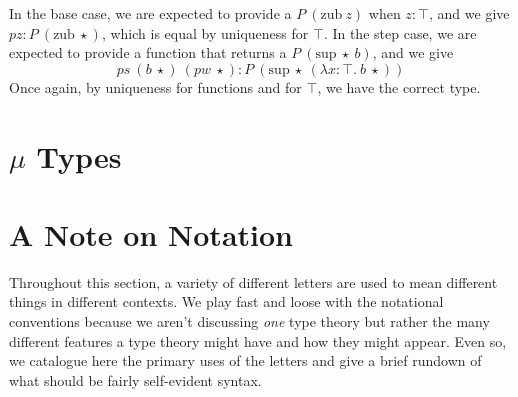\documentclass{report}
\renewcommand{\sup}{\const{sup}}
\newcommand{\zub}{\const{zub}}
\newcommand{\const}[1]{\text{#1}}
\begin{document}
In the base case, we are expected to provide a $P ~ (\zub ~ z)$ when $z: \top$, and we give $pz : P ~ (\zub ~ \star)$, which is equal by uniqueness for $\top$. In the step case, we are expected to provide a function that returns a $P ~ (\sup ~ \star ~ b)$, and we give $$ps ~ (b ~ \star) ~ (pw ~ \star): P ~ (\sup ~ \star ~ (\lambda x: \top. ~ b ~ \star))$$ Once again, by uniqueness for functions and for $\top$, we have the correct type.

\section{$\mu$ Types}

\newpage
\section{A Note on Notation}

Throughout this section, a variety of different letters are used to mean different things in different contexts. We play fast and loose with the notational conventions because we aren't discussing \emph{one} type theory but rather the many different features a type theory might have and how they might appear. Even so, we catalogue here the primary uses of the letters and give a brief rundown of what should be fairly self-evident syntax.
\end{document}

